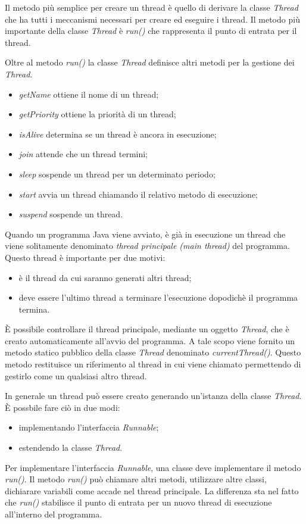 \documentclass[12pt]{report}
\begin{document}
Il metodo più semplice per creare un thread è quello di derivare la classe \textit{Thread} che ha tutti i meccanismi necessari per creare ed eseguire i thread. Il metodo più importante della classe \textit{Thread} è \textit{run()} che rappresenta il punto di entrata per il thread.
\begin{example}{}{}

\end{example}
Oltre al metodo \textit{run()} la classe \textit{Thread} definisce altri metodi per la gestione dei \textit{Thread}.
\begin{itemize}
	\item \textit{getName} ottiene il nome di un thread;
	\item \textit{getPriority} ottiene la priorità di un thread;
	\item \textit{isAlive} determina se un thread è ancora in esecuzione;
	\item \textit{join} attende che un thread termini;
	\item \textit{sleep} sospende un thread per un determinato periodo;
	\item \textit{start} avvia un thread chiamando il relativo metodo di esecuzione;
	\item \textit{suspend} sospende un thread.
\end{itemize}
Quando un programma Java viene avviato, è già in esecuzione un thread che viene solitamente denominato \textit{thread principale (main thread)} del programma. Questo thread è importante per due motivi:
\begin{itemize}
	\item è il thread da cui saranno generati altri thread;
	\item deve essere l'ultimo thread a terminare l'esecuzione dopodichè il programma termina.
\end{itemize}
È possibile controllare il thread principale, mediante un oggetto \textit{Thread}, che è creato automaticamente all'avvio del programma. A tale scopo viene fornito un metodo statico pubblico della classe \textit{Thread} denominato \textit{currentThread()}. Questo metodo restituisce un riferimento al thread in cui viene chiamato permettendo di gestirlo come un qualsiasi altro thread.

In generale un thread può essere creato generando un'istanza della classe \textit{Thread}. È possbile fare ciò in due modi:
\begin{itemize}
	\item implementando l'interfaccia \textit{Runnable};
	\item estendendo la classe \textit{Thread}.
\end{itemize}
Per implementare l'interfaccia \textit{Runnable}, una classe deve implementare il metodo \textit{run()}. Il metodo \textit{run()} può chiamare altri metodi, utilizzare altre classi, dichiarare variabili come accade nel thread principale. La differenza sta nel fatto che \textit{run()} stabilisce il punto di entrata per un nuovo thread di esecuzione all'interno del programma.
\end{document}
